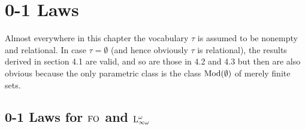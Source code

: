 \setcounter{chapter}{3}
\chapter{0-1 Laws}
Almost everywhere in this chapter the vocabulary $\tau$ is assumed to be nonempty and relational. In case $\tau = \emptyset$ (and hence obviously $\tau$ is relational), the results derived in section 4.1 are valid, and so are those in 4.2 and 4.3 but then are also obvious because the only parametric class is the class $\mathrm{Mod}(\emptyset)$ of merely finite sets.
\setcounter{section}{0}
\section{0-1 Laws for $\folog$ and $\inflog[\omega]$}
